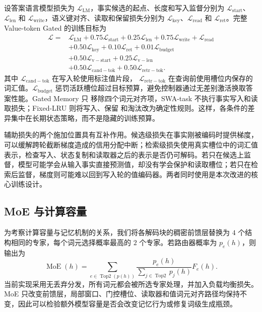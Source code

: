 \documentclass[letterpaper]{article}
\begin{document}
设答案语言模型损失为 $\mathcal{L}_{\mathrm{LM}}$，事实候选的起点、长度和写入监督分别为 $\mathcal{L}_{\mathrm{start}}$、$\mathcal{L}_{\mathrm{len}}$ 和 $\mathcal{L}_{\mathrm{write}}$，语义键对齐、读取和保留损失分别为 $\mathcal{L}_{\mathrm{key}}$、$\mathcal{L}_{\mathrm{read}}$ 和 $\mathcal{L}_{\mathrm{ret}}$。完整 Value-token Gated 的训练目标为
\begin{equation}
\begin{split}
\mathcal{L}={}&\mathcal{L}_{\mathrm{LM}}
+0.75\mathcal{L}_{\mathrm{start}}+0.25\mathcal{L}_{\mathrm{len}}
+0.75\mathcal{L}_{\mathrm{write}}+\mathcal{L}_{\mathrm{read}}\\
&+0.50\mathcal{L}_{\mathrm{key}}+0.10\mathcal{L}_{\mathrm{ret}}
+0.01\mathcal{L}_{\mathrm{budget}}\\
&+0.50\mathcal{L}_{\mathrm{v-start}}+0.25\mathcal{L}_{\mathrm{v-len}}\\
&+0.50\mathcal{L}_{\mathrm{cand-tok}}+0.50\mathcal{L}_{\mathrm{retr-tok}}.
\end{split}
\end{equation}
其中 $\mathcal{L}_{\mathrm{cand-tok}}$ 在写入轮使用标注值片段，
$\mathcal{L}_{\mathrm{retr-tok}}$ 在查询前使用槽位内保存的词汇值。$\mathcal{L}_{\mathrm{budget}}$
惩罚活跃槽位超过目标预算，避免控制器通过无差别激活换取答案性能。Gated Memory 只
移除四个词元对齐项，SWA-task 不执行事实写入和读取损失；Fixed-LRU 则将写入、保留
和淘汰改为确定性规则。这样，各条件的差异集中在长期状态策略，而不是隐藏的训练预算。

辅助损失的两个施加位置具有互补作用。候选级损失在事实刚被编码时提供梯度，可以缓解跨轮截断梯度造成的信用分配中断；检索级损失使用真实槽位中的词汇值表示，检查写入、状态复制和读取器之后的表示是否仍可解码。若只在候选上监督，模型可能学会从输入事实直接预测值，却没有学会保护和读取槽位；若只在检索后监督，梯度则可能难以回到写入轮的值编码器。两者同时使用是本次改进的核心训练设计。

\subsection{MoE 与计算容量}

为考察计算容量与记忆机制的关系，我们将各解码块的稠密前馈层替换为 $4$ 个结构相同的专家，每个词元选择概率最高的 $2$ 个专家。若路由器概率为 $p_e(h)$，则输出为
\begin{equation}
\operatorname{MoE}(h)=\sum_{e\in\operatorname{Top2}(p(h))}
\frac{p_e(h)}{\sum_{j\in\operatorname{Top2}}p_j(h)}F_e(h).
\end{equation}
当前实现采用无丢弃分发，所有词元都会被所选专家处理，并加入负载均衡损失。MoE 只改变前馈层，局部窗口、门控槽位、读取器和值词元对齐路径均保持不变，因此可以检验额外模型容量是否会改变记忆行为或修复词级生成瓶颈。
\end{document}
